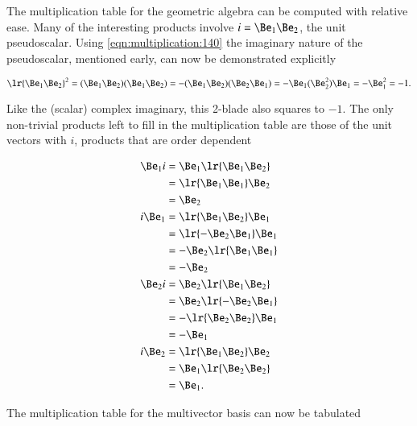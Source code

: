 %
%
The multiplication table for the  geometric algebra can be computed with relative ease.
Many of the interesting products involve \( i = \Be_1 \Be_2 \), the unit pseudoscalar.
Using \cref{eqn:multiplication:140} the imaginary nature of the pseudoscalar, mentioned early, can now be demonstrated explicitly

\begin{dmath}\label{eqn:SimpleProducts2:220}
   \lr{ \Be_1 \Be_2 }^2
   =
   (\Be_1 \Be_2)(\Be_1 \Be_2)
   =
   -(\Be_1 \Be_2)(\Be_2 \Be_1)
   =
   -\Be_1 (\Be_2^2 ) \Be_1
   =
   -\Be_1^2
   = -1.
\end{dmath}

Like the (scalar) complex imaginary, this 2-blade also squares to \( -1 \).
The only non-trivial products left to fill in the  multiplication table are those of the unit vectors with \( i \), products that are order dependent

\begin{dmath}\label{eqn:SimpleProducts2:180}
\begin{aligned}
   \Be_1 i &= \Be_1 \lr{ \Be_1 \Be_2 } \\
           &= \lr{ \Be_1 \Be_1 } \Be_2 \\
           &= \Be_2 \\
   i \Be_1 &= \lr{ \Be_1 \Be_2 } \Be_1 \\
           &= \lr{ -\Be_2 \Be_1 } \Be_1 \\
           &= -\Be_2 \lr{ \Be_1 \Be_1 } \\
           &= -\Be_2 \\
   \Be_2 i &= \Be_2 \lr{ \Be_1 \Be_2 } \\
           &= \Be_2 \lr{ -\Be_2 \Be_1 } \\
           &= -\lr{ \Be_2 \Be_2 }\Be_1 \\
           &= -\Be_1 \\
   i \Be_2 &= \lr{ \Be_1 \Be_2 } \Be_2 \\
           &= \Be_1 \lr{ \Be_2 \Be_2 } \\
           &= \Be_1.
\end{aligned}
\end{dmath}

The multiplication table for the  multivector basis can now be tabulated


